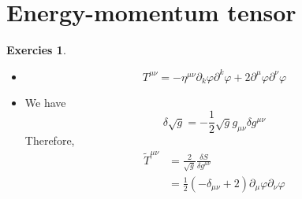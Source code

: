 \documentclass[12pt,a4paper]{article}
\theoremstyle{definition}
\newtheorem{exer}{Exercies}[subsection]
\begin{document}
\section{Energy-momentum tensor}
\begin{exer}
	\begin{itemize}
		\item \[
		T^{\mu \nu} = -\eta^{\mu \nu}\partial_{k}\varphi \partial^{k}\varphi + 2 \partial^{\mu}\varphi \partial^{\nu}\varphi
		\]
		\item We have
		\[
			\delta \sqrt{g}= -\frac{1}{2}\sqrt{g} g_{\mu\nu} \delta g^{\mu\nu}
		\]
		Therefore,
		\[
		\begin{aligned}
		\tilde{T}^{\mu\nu} &=\frac{2}{\sqrt{g}}\frac{\delta S}{\delta g^{\mu\nu}}\\
		&=\frac{1}{2} (-\delta_{\mu\nu}+2) \partial_{\mu} \varphi \partial_{\nu}\varphi
		\end{aligned}
		\]
	\end{itemize}
\end{exer}
\end{document}
